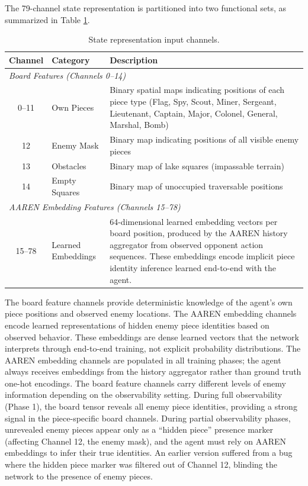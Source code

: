 The 79-channel state representation is partitioned into two functional sets, as summarized in Table \ref{tab:state_channels}.

\begin{table}[h]
\centering
\caption{State representation input channels.}
\label{tab:state_channels}
\begin{tabular}{clp{8cm}}
\hline
\textbf{Channel} & \textbf{Category} & \textbf{Description} \\
\hline
\multicolumn{3}{l}{\textit{Board Features (Channels 0--14)}} \\
0--11 & Own Pieces & Binary spatial maps indicating positions of each piece type (Flag, Spy, Scout, Miner, Sergeant, Lieutenant, Captain, Major, Colonel, General, Marshal, Bomb) \\
12 & Enemy Mask & Binary map indicating positions of all visible enemy pieces \\
13 & Obstacles & Binary map of lake squares (impassable terrain) \\
14 & Empty Squares & Binary map of unoccupied traversable positions \\
\hline
\multicolumn{3}{l}{\textit{AAREN Embedding Features (Channels 15--78)}} \\
15--78 & Learned Embeddings & 64-dimensional learned embedding vectors per board position, produced by the AAREN history aggregator from observed opponent action sequences. These embeddings encode implicit piece identity inference learned end-to-end with the agent. \\
\hline
\end{tabular}
\end{table}

The board feature channels provide deterministic knowledge of the agent's own piece positions and observed enemy locations. The AAREN embedding channels encode learned representations of hidden enemy piece identities based on observed behavior. These embeddings are dense learned vectors that the network interprets through end-to-end training, not explicit probability distributions. The AAREN embedding channels are populated in all training phases; the agent always receives embeddings from the history aggregator rather than ground truth one-hot encodings. The board feature channels carry different levels of enemy information depending on the observability setting. During full observability (Phase 1), the board tensor reveals all enemy piece identities, providing a strong signal in the piece-specific board channels. During partial observability phases, unrevealed enemy pieces appear only as a ``hidden piece'' presence marker (affecting Channel 12, the enemy mask), and the agent must rely on AAREN embeddings to infer their true identities. An earlier version suffered from a bug where the hidden piece marker was filtered out of Channel 12, blinding the network to the presence of enemy pieces. 
